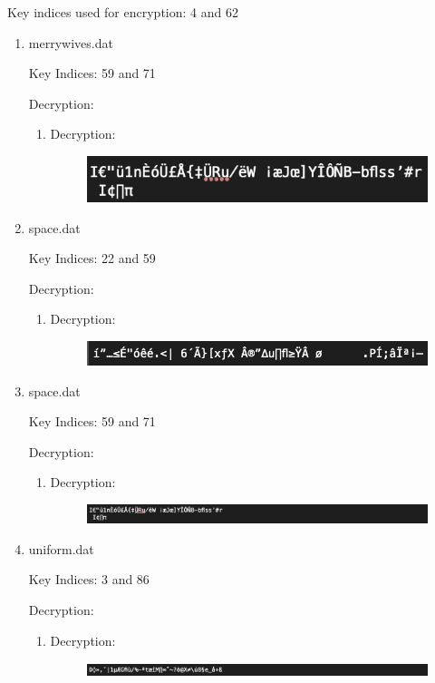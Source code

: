 \documentclass{ashoka-crypto}
\begin{document}
Key indices used for encryption: 4 and 62
\clearpage
\begin{enumerate}
\item merrywives.dat

Key Indices: 59 and 71

Decryption:

\begin{enumerate}
\item Decryption:
\begin{figure}[h]
\includegraphics[width=10cm]{3_2_1_merrywives}
\centering
\end{figure}
\end{enumerate}
\item space.dat

Key Indices: 22 and 59

Decryption:

\begin{enumerate}
\item Decryption:
\begin{figure}[h]
\includegraphics[width=12cm]{3_2_2_space}
\centering
\end{figure}
\end{enumerate}

\item space.dat

Key Indices: 59 and 71

Decryption:

\begin{enumerate}
\item Decryption:
\begin{figure}[h]
\includegraphics[width=12cm]{3_2_3_ulysses}
\centering
\end{figure}
\end{enumerate}

\item uniform.dat

Key Indices: 3 and 86

Decryption:

\begin{enumerate}
\item Decryption:
\begin{figure}[h]
\includegraphics[width=12cm]{3_2_4_uniform}
\centering
\end{figure}
\end{enumerate}
\end{enumerate}
\end{document}
